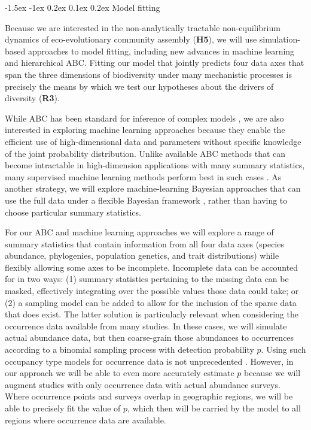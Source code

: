 \documentclass[11pt]{article}
\makeatletter
\renewcommand\subsubsection{\@startsection{subsection}{1}{\z@}%
                                  {-1.5ex \@plus -1ex \@minus 0.2ex}%
                                  {0.1ex \@plus 0.2ex}%
                                  {\normalfont\bfseries}}
\makeatother
\begin{document}
\subsubsection{Model fitting}\label{model-fitting}

Because we are interested in the non-analytically tractable
non-equilibrium dynamics of eco-evolutionary community assembly
(\textbf{H5}), we will use simulation-based approaches to model fitting,
including new advances in machine learning and hierarchical ABC. Fitting
our model that jointly predicts four data axes that span the three
dimensions of biodiversity under many mechanistic processes is precisely
the means by which we test our hypotheses about the drivers of diversity
(\textbf{R3}).

While ABC has been standard for inference of complex models
\cite{Beaumont2010-si}, we are also interested in exploring machine
learning approaches because they enable the efficient use of
high-dimensional data and parameters without specific knowledge of the
joint probability distribution. Unlike available ABC methods that can
become intractable in high-dimension applications with many summary
statistics, many supervised machine learning methods perform best in
such cases \cite{Anderson2014-fi,Breiman2001-ux}. As another strategy,
we will explore machine-learning Bayesian approaches that can use the
full data under a flexible Bayesian framework \cite{Chan2018-qh}, rather
than having to choose particular summary statistics.

For our ABC and machine learning approaches we will explore a range of
summary statistics that contain information from all four data axes
(species abundance, phylogenies, population genetics, and trait
distributions) while flexibly allowing some axes to be incomplete.
Incomplete data can be accounted for in two ways: (1) summary statistics
pertaining to the missing data can be masked, effectively integrating
over the possible values those data could take; or (2) a sampling model
can be added to allow for the inclusion of the sparse data that does
exist. The latter solution is particularly relevant when considering the
occurrence data available from many studies. In these cases, we will
simulate actual abundance data, but then coarse-grain those abundances
to occurrences according to a binomial sampling process with detection
probability $p$. Using such occupancy type models for occurrence data
is not unprecedented \cite{Tingley2009-kt}. However, in our approach we
will be able to even more accurately estimate $p$ because we will
augment studies with only occurrence data with actual abundance surveys.
Where occurrence points and surveys overlap in geographic regions, we
will be able to precisely fit the value of $p$, which then will be
carried by the model to all regions where occurrence data are available.
\end{document}
